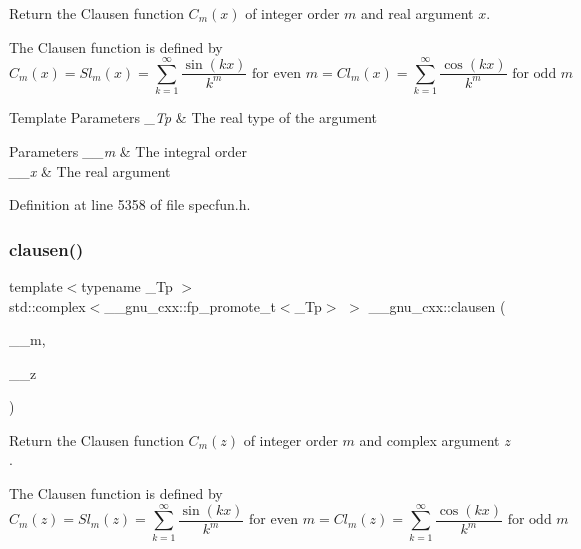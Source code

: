 Return the Clausen function $ C_m(x) $ of integer order $ m $ and real argument $ x $.

The Clausen function is defined by \[ C_m(x) = Sl_m(x) = \sum_{k=1}^\infty\frac{\sin(kx)}{k^m} \mbox{ for even } m = Cl_m(x) = \sum_{k=1}^\infty\frac{\cos(kx)}{k^m} \mbox{ for odd } m \]


\begin{DoxyTemplParams}{Template Parameters}
{\em \+\_\+\+Tp} & The real type of the argument \\
\hline
\end{DoxyTemplParams}

\begin{DoxyParams}{Parameters}
{\em \+\_\+\+\_\+m} & The integral order \\
\hline
{\em \+\_\+\+\_\+x} & The real argument \\
\hline
\end{DoxyParams}


Definition at line 5358 of file specfun.\+h.

\mbox{\label{group__gnu__math__spec__func_gaf7c4317ef6bfd3a4bf0ddcba22ee7588}} 
\subsubsection{\texorpdfstring{clausen()}{clausen()}\hspace{0.1cm}{\footnotesize\ttfamily [2/2]}}
{\footnotesize\ttfamily template$<$typename \+\_\+\+Tp $>$ \\
std\+::complex$<$\+\_\+\+\_\+gnu\+\_\+cxx\+::fp\+\_\+promote\+\_\+t$<$\+\_\+\+Tp$>$ $>$ \+\_\+\+\_\+gnu\+\_\+cxx\+::clausen (\begin{DoxyParamCaption}\item[{unsigned int}]{\+\_\+\+\_\+m,  }\item[{std\+::complex$<$ \+\_\+\+Tp $>$}]{\+\_\+\+\_\+z }\end{DoxyParamCaption})\hspace{0.3cm}{\ttfamily [inline]}}

Return the Clausen function $ C_m(z) $ of integer order $ m $ and complex argument $ z $.

The Clausen function is defined by \[ C_m(z) = Sl_m(z) = \sum_{k=1}^\infty\frac{\sin(kx)}{k^m} \mbox{ for even } m = Cl_m(z) = \sum_{k=1}^\infty\frac{\cos(kx)}{k^m} \mbox{ for odd } m \]


